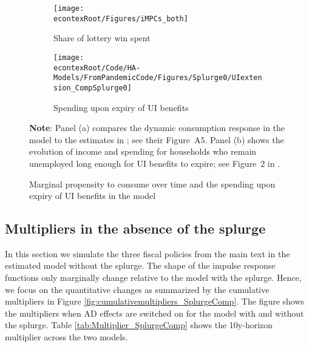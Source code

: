 \documentclass[\econtexRoot/HAFiscal]{subfiles}
\begin{document}
\begin{figure}[thb]
	\centering
	\begin{subfigure}[b]{.48\linewidth}
		\centering
		\texttt{[image: \\econtexRoot/Figures/iMPCs\_both]}
		\caption{Share of lottery win spent}
		\notinsubfile{\label{fig:USaggmpclotterywin_wSplZero}}
	\end{subfigure}
	\begin{subfigure}[b]{.48\linewidth}
		\centering
		\texttt{[image: \\econtexRoot/Code/HA-Models/FromPandemicCode/Figures/Splurge0/UIextension\_CompSplurge0]}
		\caption{Spending upon expiry of UI benefits}
		\notinsubfile{\label{fig:expiryUI_wSplZero}}
	\end{subfigure}%
	\caption{Marginal propensity to consume over time and the spending upon expiry of UI benefits in the model}
	\notinsubfile{\label{fig:untargetedMoments_wSplZero}}
	\parbox{16cm}{\small \vspace{.15cm} \textbf{Note}: Panel (a) compares the dynamic consumption response in the model to the estimates in \citet{fagereng_mpc_2021}; see their Figure~A5.
Panel (b) shows the evolution of income and spending for households who remain unemployed long enough for UI benefits to expire; see Figure~2 in \citet{ganongConsumer2019}.\normalsize}
\end{figure}




\FloatBarrier
\subsection{Multipliers in the absence of the splurge}

In this section we simulate the three fiscal policies from the main text in the estimated model without the splurge.
The shape of the impulse response functions only marginally change relative to the model with the splurge.
Hence, we focus on the quantitative changes as summarized by the cumulative multipliers in Figure \ref{fig:cumulativemultipliers_SplurgeComp}.
The figure shows the multipliers when AD effects are switched on for the model with and without the splurge.
Table \ref{tab:Multiplier_SplurgeComp} shows the 10y-horizon multiplier across the two models.
\end{document}
